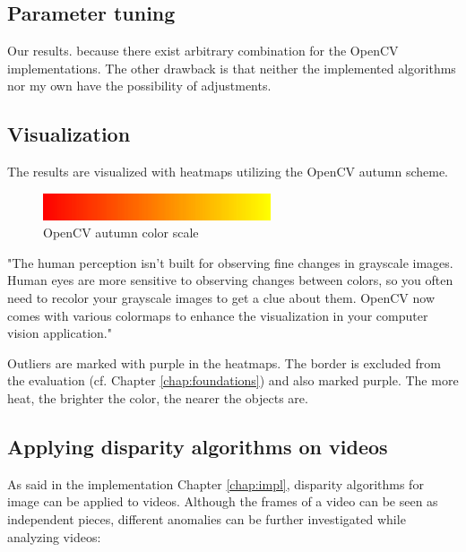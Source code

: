 \subsection*{Parameter tuning}

Our results.
because there exist arbitrary combination for the OpenCV implementations.
The other drawback is that neither the implemented algorithms nor my own have the possibility of adjustments.

\subsection*{Visualization}

The results are visualized with heatmaps utilizing the OpenCV autumn scheme.

\begin{figure}[h!]
  \centering
  \includegraphics[width=0.6\textwidth]{src/images/colorscale.png}
  \caption[OpenCV autumn color scale]{OpenCV autumn color scale\protect\footnotemark}
  \label{fig:colorscale}
\end{figure}


"The human perception isn't built for observing fine changes in grayscale images. Human eyes are more sensitive to observing changes between colors, so you often need to recolor your grayscale images to get a clue about them. OpenCV now comes with various colormaps to enhance the visualization in your computer vision application."

Outliers are marked with purple in the heatmaps.
The border is excluded from the evaluation (cf. Chapter \ref{chap:foundations}) and also marked purple.
The more heat, the brighter the color, the nearer the objects are.

\subsection*{Applying disparity algorithms on videos}

As said in the implementation Chapter \ref{chap:impl}, disparity algorithms for image can be applied to videos.
Although the frames of a video can be seen as independent pieces, different anomalies can be further investigated while analyzing videos:

